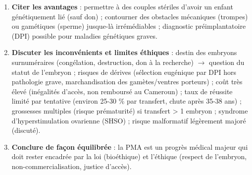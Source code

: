 \documentclass[11pt]{article}
\begin{document}
\begin{methode}
\begin{enumerate}
\item \textbf{Citer les avantages} : permettre à des couples stériles d'avoir un enfant génétiquement lié (sauf don) ; contourner des obstacles mécaniques (trompes) ou gamétiques (sperme) jusque-là irrémédiables ; diagnostic préimplantatoire (DPI) possible pour maladies génétiques graves.
\item \textbf{Discuter les inconvénients et limites éthiques} : destin des embryons surnuméraires (congélation, destruction, don à la recherche) $\rightarrow$ question du statut de l'embryon ; risques de dérives (sélection eugénique par DPI hors pathologie grave, marchandisation des gamètes/ventres porteurs) ; coût très élevé (inégalités d'accès, non remboursé au Cameroun) ; taux de réussite limité par tentative (environ 25-30 \% par transfert, chute après 35-38 ans) ; grossesses multiples (risque prématurité) si transfert > 1 embryon ; syndrome d'hyperstimulation ovarienne (SHSO) ; risque malformatif légèrement majoré (discuté).
\item \textbf{Conclure de façon équilibrée} : la PMA est un progrès médical majeur qui doit rester encadrée par la loi (bioéthique) et l'éthique (respect de l'embryon, non-commercialisation, justice d'accès).
\end{enumerate}
\end{methode}
\end{document}
